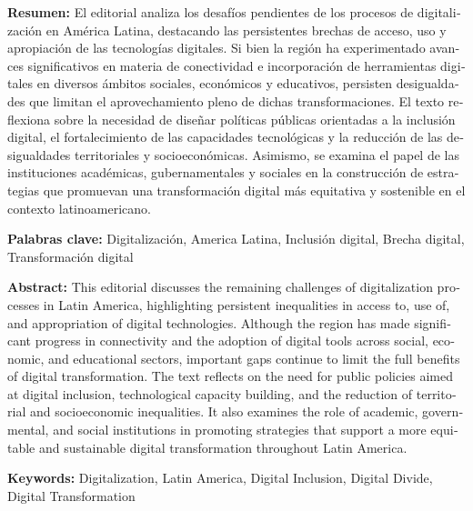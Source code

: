 \documentclass{article}
\begin{document}
\begin{tcolorbox}[colback=brown!8!white,colframe=brown!8!white,boxrule=0pt,arc=2pt,left=4pt,right=4pt,top=3pt,bottom=3pt,before skip=4pt,after skip=4pt]
\begin{otherlanguage}{spanish}
\sffamily\small \textbf{Resumen:} El editorial analiza los desafíos pendientes de los procesos de digitalización en América Latina, destacando las persistentes brechas de acceso, uso y apropiación de las tecnologías digitales. Si bien la región ha experimentado avances significativos en materia de conectividad e incorporación de herramientas digitales en diversos ámbitos sociales, económicos y educativos, persisten desigualdades que limitan el aprovechamiento pleno de dichas transformaciones. El texto reflexiona sobre la necesidad de diseñar políticas públicas orientadas a la inclusión digital, el fortalecimiento de las capacidades tecnológicas y la reducción de las desigualdades territoriales y socioeconómicas. Asimismo, se examina el papel de las instituciones académicas, gubernamentales y sociales en la construcción de estrategias que promuevan una transformación digital más equitativa y sostenible en el contexto latinoamericano.
\par\smallskip\noindent\textbf{Palabras clave:} Digitalización, America Latina, Inclusión digital, Brecha digital, Transformación digital
\end{otherlanguage}
\end{tcolorbox}

\begin{tcolorbox}[colback=brown!8!white,colframe=brown!8!white,boxrule=0pt,arc=2pt,left=4pt,right=4pt,top=3pt,bottom=3pt,before skip=4pt,after skip=4pt]
\begin{otherlanguage}{english}
\sffamily\small \textbf{Abstract:} This editorial discusses the remaining challenges of digitalization processes in Latin America, highlighting persistent inequalities in access to, use of, and appropriation of digital technologies. Although the region has made significant progress in connectivity and the adoption of digital tools across social, economic, and educational sectors, important gaps continue to limit the full benefits of digital transformation. The text reflects on the need for public policies aimed at digital inclusion, technological capacity building, and the reduction of territorial and socioeconomic inequalities. It also examines the role of academic, governmental, and social institutions in promoting strategies that support a more equitable and sustainable digital transformation throughout Latin America.
\par\smallskip\noindent\textbf{Keywords:} Digitalization, Latin America, Digital Inclusion, Digital Divide, Digital Transformation
\end{otherlanguage}
\end{tcolorbox}
\end{document}
